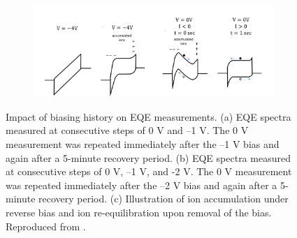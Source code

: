 \begin{figure}[ht!]
    
    \begin{subfigure}[t]{0.9\textwidth}
        \centering
        \includegraphics[width=\textwidth]{chapters/material_properties/images/ions.png} %
        \caption{}
        \label{fig:ch2:eqe_drop_mechanism}
    \end{subfigure}

    \caption{Impact of biasing history on EQE measurements. (a) EQE spectra measured at consecutive steps of 0 V and –1 V. The 0 V measurement was repeated immediately after the –1 V bias and again after a 5-minute recovery period. (b) EQE spectra measured at consecutive steps of 0 V, –1 V, and -2 V. The 0 V measurement was repeated immediately after the –2 V bias and again after a 5-minute recovery period. (c) Illustration of ion accumulation under reverse bias and ion re-equilibration upon removal of the bias. Reproduced from \cite{Bowring2018ReverseCells}.}
    \label{fig:ch2:eqe}
\end{figure}

